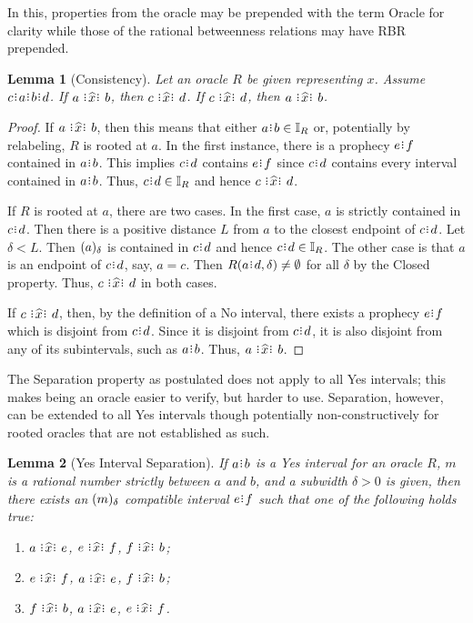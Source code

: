 \documentclass[12pt]{article}
\newtheorem{lemma}{Lemma}[section]
\begin{document}
In this, properties from the oracle may be prepended with the term Oracle for clarity while those of the rational betweenness relations may have RBR prepended. 

\begin{lemma}[Consistency]\label{os-con}
    Let an oracle $R$ be given representing $x$. Assume $c\rint a\rint b\rint d$. If $a \xora b$, then $c \xora d$. If \sout{$c \xora d$}, then \sout{$a \xora b$}. 
\end{lemma}

\begin{proof}
    If $a \xora b$, then this means that either $a\rint b \in \mathbb{I}_R$ or, potentially by relabeling, $R$ is rooted at $a$. In the first instance, there is a prophecy $e\rint f$ contained in $a\rint b$. This implies $c\rint d$ contains $e\rint f$ since $c\rint d$ contains every interval contained in $a\rint b$. Thus, $c\rint d \in \mathbb{I}_R$ and hence $c \xora d$. 
    
    If $R$ is rooted at $a$, there are two cases. In the first case, $a$ is strictly contained in $c\rint d$. Then there is a positive distance $L$ from $a$ to the closest endpoint of $c\rint d$. Let $\delta < L$. Then $(a)_{\delta}$ is contained in $c\rint d$ and hence $c\rint d \in \mathbb{I}_R$. The other case is that $a$ is an endpoint of $c\rint d$, say, $ a= c$. Then $R(a\rint d, \delta) \neq \emptyset$ for all $\delta$ by the Closed property. Thus, $c \xora d$ in both cases.  

    If \sout{$c \xora d$}, then, by the definition of a No interval, there exists a prophecy $e\rint f$ which is disjoint from $c\rint d$. Since it is disjoint from $c\rint d$, it is also disjoint from any of its subintervals, such as $a\rint b$. Thus, \sout{$a \xora b$}.    
\end{proof}

The Separation property as postulated does not apply to all Yes intervals; this makes being an oracle easier to verify, but harder to use. Separation, however, can be extended to all Yes intervals though potentially non-constructively for rooted oracles that are not established as such.

\begin{lemma}[Yes Interval Separation]
    If $a\rint  b$ is a Yes interval for an oracle $R$, $m$ is a rational number strictly between $a$ and $b$, and a subwidth $\delta > 0$ is given, then there exists an $(m)_{\delta}$ compatible interval $e\rint f$ such that one of the following holds true: 
    \begin{enumerate}
        \item $a \xora e$, \sout{$e\xora f$}, \sout{$f\xora b$};
        \item $e \xora f$, \sout{$a\xora e$}, \sout{$f\xora b$};
        \item $f \xora b$, \sout{$a\xora e$}, \sout{$e\xora f$}.
    \end{enumerate}
\end{lemma}
\end{document}
